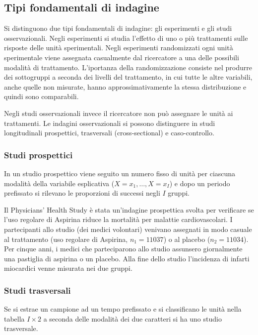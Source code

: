 \subsection{Tipi fondamentali di indagine}

Si distinguono due tipi fondamentali di indagine: gli esperimenti e gli studi osservazionali.
Negli esperimenti si studia l'effetto di uno o più trattamenti sulle risposte delle unità sperimentali.
Negli esperimenti randomizzati ogni unità sperimentale viene assegnata casualmente dal ricercatore a una delle possibili modalità di trattamento.
L'iportanza della randomizzazione consiste nel produrre dei sottogruppi a seconda dei livelli del trattamento, in cui tutte le altre variabili, anche quelle non misurate, hanno approssimativamente la stessa distribuzione e quindi sono comparabili.

Negli studi osservazionali invece il ricercatore non può assegnare le unità ai trattamenti. 
Le indagini osservazionali si possono distinguere in studi longitudinali prospettici,  trasversali (cross-sectional) e caso-controllo.

\subsubsection{Studi prospettici}

In un studio prospettico viene seguito un numero fisso di unità per ciascuna modalità della variabile esplicativa ($X = x_1, \dots, X = x_I$) e dopo un periodo prefissato si rilevano le proporzioni di successi negli $I$ gruppi.

\begin{exmp}
Il Physicians' Health Study è stata un'indagine prospettica svolta per verificare se l'uso regolare di Aspirina riduce la mortalità per malattie cardiovascolari.
I partecipanti allo studio (dei medici volontari) venivano assegnati in modo casuale al trattamento (uso regolare di Aspirina, $n_1=11037$) o al placebo ($n_2=11034$).
Per cinque anni, i medici che parteciparono allo studio assunsero giornalmente una pastiglia di aspirina o un placebo.
Alla fine dello studio l'incidenza di infarti miocardici venne misurata nei due gruppi.
\end{exmp}


\subsubsection{Studi trasversali}

Se si estrae un campione ad un tempo prefissato e si classificano le unità nella tabella $I \times 2$ a seconda delle modalità dei due caratteri si ha uno studio trasversale.

